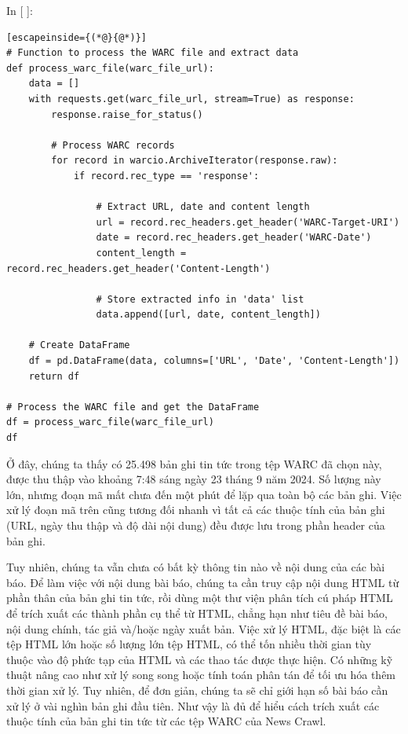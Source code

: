 In {[} {]}:

\begin{lstlisting}[escapeinside={(*@}{@*)}]
# Function to process the WARC file and extract data
def process_warc_file(warc_file_url):
    data = []
    with requests.get(warc_file_url, stream=True) as response:
        response.raise_for_status()

        # Process WARC records
        for record in warcio.ArchiveIterator(response.raw):
            if record.rec_type == 'response':

                # Extract URL, date and content length
                url = record.rec_headers.get_header('WARC-Target-URI')
                date = record.rec_headers.get_header('WARC-Date')
                content_length = record.rec_headers.get_header('Content-Length')

                # Store extracted info in 'data' list
                data.append([url, date, content_length])

    # Create DataFrame
    df = pd.DataFrame(data, columns=['URL', 'Date', 'Content-Length'])
    return df

# Process the WARC file and get the DataFrame
df = process_warc_file(warc_file_url)
df
\end{lstlisting}

Ở đây, chúng ta thấy có 25.498 bản ghi tin tức trong tệp WARC đã chọn này, được thu thập vào khoảng 7:48 sáng ngày 23 tháng 9 năm 2024. Số lượng này lớn, nhưng đoạn mã mất chưa đến một phút để lặp qua toàn bộ các bản ghi. Việc xử lý đoạn mã trên cũng tương đối nhanh vì tất cả các thuộc tính của bản ghi (URL, ngày thu thập và độ dài nội dung) đều được lưu trong phần header của bản ghi.

Tuy nhiên, chúng ta vẫn chưa có bất kỳ thông tin nào về nội dung của các bài báo. Để làm việc với nội dung bài báo, chúng ta cần truy cập nội dung HTML từ phần thân của bản ghi tin tức, rồi dùng một thư viện phân tích cú pháp HTML để trích xuất các thành phần cụ thể từ HTML, chẳng hạn như tiêu đề bài báo, nội dung chính, tác giả và/hoặc ngày xuất bản. Việc xử lý HTML, đặc biệt là các tệp HTML lớn hoặc số lượng lớn tệp HTML, có thể tốn nhiều thời gian tùy thuộc vào độ phức tạp của HTML và các thao tác được thực hiện. Có những kỹ thuật nâng cao như xử lý song song hoặc tính toán phân tán để tối ưu hóa thêm thời gian xử lý. Tuy nhiên, để đơn giản, chúng ta sẽ chỉ giới hạn số bài báo cần xử lý ở vài nghìn bản ghi đầu tiên. Như vậy là đủ để hiểu cách trích xuất các thuộc tính của bản ghi tin tức từ các tệp WARC của News Crawl.

